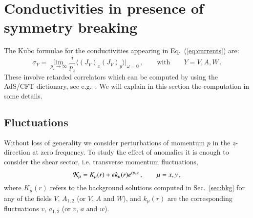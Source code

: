 \documentclass[epj]{webofc}
\begin{document}
\section{Conductivities in presence of symmetry breaking}
\label{sec:Conductivities}

The Kubo formulae for the conductivities appearing in Eq.~(\ref{eq:currents}) are:
 \begin{equation}
\sigma_{Y} = \lim_{p_z\to\infty} \frac{i}{p_z} \langle (J_{Y})_x (J_V)_y \rangle|_{\omega=0}  \,, \qquad \textrm{with} \qquad Y = V, A, W \,. \label{eq:sigmaY}
\end{equation}
These involve retarded correlators which can be computed by using the AdS/CFT dictionary, see e.g.~\cite{Son:2002sd,Herzog:2002pc,Kaminski:2009dh,Landsteiner:2012kd}. We will explain in this section the computation in some details.



\subsection{Fluctuations}
\label{sec:Fluctuations}

Without loss of generality we consider perturbations of momentum $p$ in the $z$-direction at zero frequency. To study the effect of anomalies  it is enough to consider the shear sector, i.e. transverse momentum fluctuations,
\begin{equation}
{\cal K}_\mu = K_\mu(r) + \epsilon k_\mu(r) e^{i p_z z}  \,, \qquad \mu = x,y \,,
\end{equation}
where $K_\mu(r)$ refers to the background solutions computed in Sec.~\ref{sec:bkg} for any of the fields $V$, $A_{1,2}$ (or $V$, $A$ and $W$), and $k_\mu(r)$ are the corresponding fluctuations $v$, $a_{1,2}$ (or $v$, $a$ and $w$).
\end{document}
